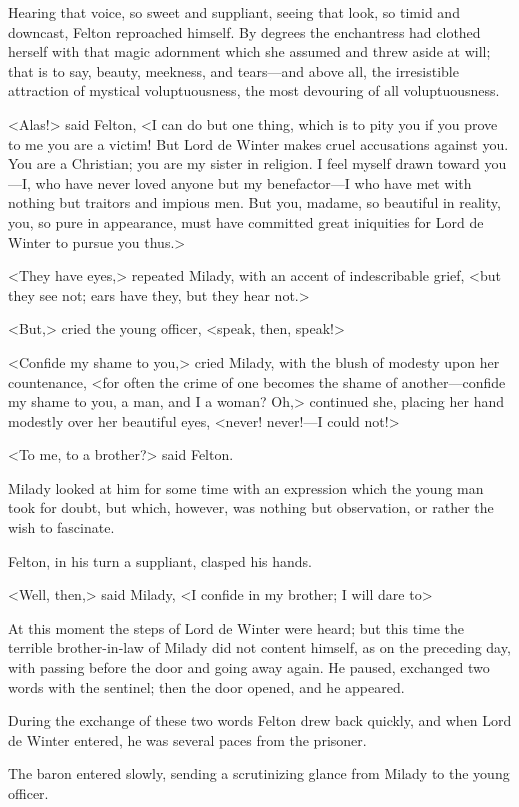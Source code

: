 Hearing that voice, so sweet and suppliant, seeing that look, so timid and downcast, Felton reproached himself. By degrees the enchantress had clothed herself with that magic adornment which she assumed and threw aside at will; that is to say, beauty, meekness, and tears—and above all, the irresistible attraction of mystical voluptuousness, the most devouring of all voluptuousness. 

<Alas!> said Felton, <I can do but one thing, which is to pity you if you prove to me you are a victim! But Lord de Winter makes cruel accusations against you. You are a Christian; you are my sister in religion. I feel myself drawn toward you—I, who have never loved anyone but my benefactor—I who have met with nothing but traitors and impious men. But you, madame, so beautiful in reality, you, so pure in appearance, must have committed great iniquities for Lord de Winter to pursue you thus.> 

<They have eyes,> repeated Milady, with an accent of indescribable grief, <but they see not; ears have they, but they hear not.> 

<But,> cried the young officer, <speak, then, speak!> 

<Confide my shame to you,> cried Milady, with the blush of modesty upon her countenance, <for often the crime of one becomes the shame of another—confide my shame to you, a man, and I a woman? Oh,> continued she, placing her hand modestly over her beautiful eyes, <never! never!—I could not!> 

<To me, to a brother?> said Felton. 

Milady looked at him for some time with an expression which the young man took for doubt, but which, however, was nothing but observation, or rather the wish to fascinate. 

Felton, in his turn a suppliant, clasped his hands. 

<Well, then,> said Milady, <I confide in my brother; I will dare to\longdash> 

At this moment the steps of Lord de Winter were heard; but this time the terrible brother-in-law of Milady did not content himself, as on the preceding day, with passing before the door and going away again. He paused, exchanged two words with the sentinel; then the door opened, and he appeared. 

During the exchange of these two words Felton drew back quickly, and when Lord de Winter entered, he was several paces from the prisoner. 

The baron entered slowly, sending a scrutinizing glance from Milady to the young officer. 

